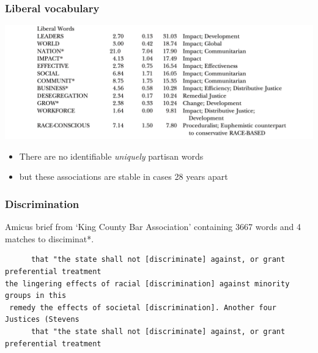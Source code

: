 \documentclass{hertieteaching}
\begin{document}
\begin{frame}\frametitle{Liberal vocabulary}

\medskip
\centerline{\includegraphics[scale=0.4]{pictures/evansetal2.png}}

\begin{itemize}
  \item There are no identifiable \textit{uniquely} partisan words  
  \item but these associations are stable in cases 28 years apart
\end{itemize}

\end{frame}

\begin{frame}[t,fragile]\frametitle{Discrimination}

Amicus brief from `King County Bar Association' containing 3667 words and 4 matches to disciminat*.

\small
\begin{verbatim}
      that "the state shall not [discriminate] against, or grant preferential treatment
the lingering effects of racial [discrimination] against minority groups in this
 remedy the effects of societal [discrimination]. Another four Justices (Stevens
      that "the state shall not [discriminate] against, or grant preferential treatment
\end{verbatim}
\normalsize

\end{frame}
\end{document}
